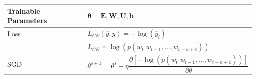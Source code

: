 \begin{customTableWrapper}{1}
\begin{table}[H]
    \begin{tabular}{|l|l|}
        \hline
         Trainable Parameters & \(\mathbf{\theta = E,W,U,b}\) \\
         \hline
         Loss & \( L_{CE}(\hat{y}, y) = -\log(\hat{y}_i) \) \\
         & \( L_{CE} = \log(p(w_t|w_{t-1},...,w_{t-n+1})) \) \\
         \hline
         SGD & \begin{minipage}{8cm}
             \vspace{0.2cm}
             \( \theta^{s+1} = \theta^s - \eta\displaystyle\dfrac{\partial[-\log(p(w_t|w_{t-1},...,w_{t-n+1}))]}{\partial\theta} \)
             \vspace{0.2cm}
         \end{minipage}\\
         \hline
    \end{tabular}
\end{table}
\end{customTableWrapper}
































